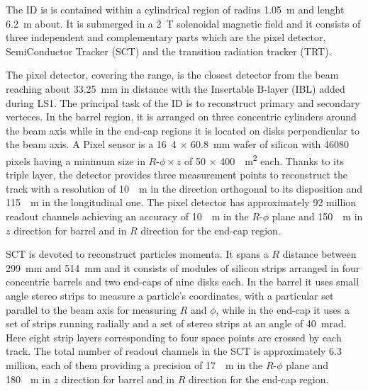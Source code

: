The ID is is contained within a cylindrical region of radius \SI{1.05}{m} and lenght \SI{6.2}{m} about. It is submerged in a \SI{2}{T} solenoidal magnetic field and it consists of three independent and complementary parts which are the pixel detector, SemiConductor Tracker (SCT) and the transition radiation tracker (TRT).

The pixel detector, covering the  range, is the closest detector from the beam reaching about \SI{33.25}{mm} in distance with the Insertable B-layer (IBL) added during LS1. The principal task of the ID is to reconstruct primary and secondary verteces. In the barrel region, it is arranged on three concentric cylinders around the beam axis while in the end-cap regions it is located on disks perpendicular to the beam axis. A Pixel sensor is a \si{16.4} $\times$ \SI{60.8}{mm} wafer of silicon with \num{46080} pixels having a minimum size in $R$-$\phi \times z$ of  \si{50} $\times$ \SI{400}{\mu m^2} each. Thanks to its triple layer, the detector provides three measurement points to reconstruct the track with a resolution of \SI{10}{\mu m} in the direction orthogonal to its disposition and \SI{115}{\mu m} in the longitudinal one. The pixel detector has approximately \num{92} million readout channels achieving an accuracy of \SI{10}{\mu m} in the $R$-$\phi$ plane and \SI{150}{\mu m} in $z$ direction for barrel and in $R$ direction for the end-cap region.

SCT is devoted to reconstruct particles momenta. It spans a $R$ distance between \SI{299}{mm} and \SI{514}{mm} and it consists of modules of silicon strips arranged in four concentric barrels and two end-caps of nine disks each. In the barrel it uses small angle stereo strips to measure a particle's coordinates, with a particular set parallel to the beam axis for measuring $R$ and $\phi$, while in the end-cap it uses a set of strips running radially and a set of stereo strips at an angle of \SI{40}{mrad}. Here eight strip layers corresponding to four space points are crossed by each track. The total number of readout channels in the SCT is approximately 6.3 million, each of them providing a precision of \SI{17}{\mu m} in the $R$-$\phi$ plane and \SI{180}{\mu m} in $z$ direction for barrel and in $R$ direction for the end-cap region.

